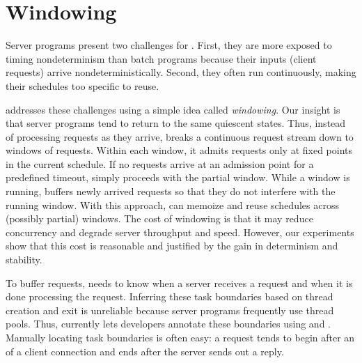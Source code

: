 \vspace{.1in}
\section{Windowing} \label{sec:window}

Server programs present two challenges for \tern.  First, they 
are more exposed to
timing nondeterminism than batch programs because their inputs
(client requests) arrive nondeterministically.  Second, they often run
continuously, making their schedules too specific to reuse.


\tern addresses these challenges using a simple idea called
\emph{windowing}.  Our insight is that server programs tend to return to the
same quiescent states.  Thus, instead of processing requests as they
arrive, \tern breaks a continuous request stream down to windows of
requests.  Within each window, it admits requests only at fixed points in
the current schedule.  If no requests arrive at an admission point for a
predefined timeout, \tern simply proceeds with the partial window.  While a
window is running, \tern buffers newly arrived requests so that they do not
interfere with the running window.  With this approach, \tern can memoize
and reuse schedules across (possibly partial) windows.
The cost of windowing is that it may reduce concurrency
and degrade server throughput and speed.  However, our experiments show
that this cost is reasonable and justified by the gain in determinism
and stability.

To buffer requests, \tern needs to know when a server receives a request
and when it is done processing the request.  Inferring these task
boundaries based on thread creation and exit is unreliable because server
programs frequently use thread pools.  Thus, \tern currently lets
developers annotate these boundaries using  and
.  Manually locating task boundaries is often easy: a
request tends to begin after an  of a client connection and ends
after the server sends out a reply.

